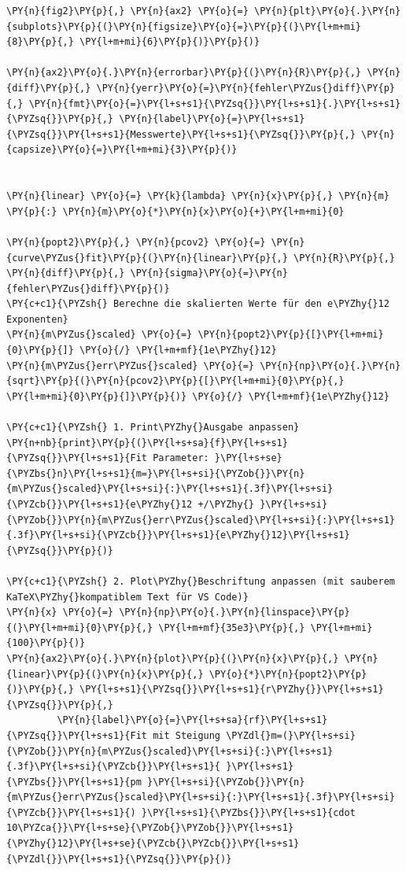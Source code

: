\begin{tcolorbox}[breakable, size=fbox, boxrule=1pt, pad at break*=1mm,colback=cellbackground, colframe=cellborder]
\begin{Verbatim}[commandchars=\\\{\}]
\PY{n}{fig2}\PY{p}{,} \PY{n}{ax2} \PY{o}{=} \PY{n}{plt}\PY{o}{.}\PY{n}{subplots}\PY{p}{(}\PY{n}{figsize}\PY{o}{=}\PY{p}{(}\PY{l+m+mi}{8}\PY{p}{,} \PY{l+m+mi}{6}\PY{p}{)}\PY{p}{)}

\PY{n}{ax2}\PY{o}{.}\PY{n}{errorbar}\PY{p}{(}\PY{n}{R}\PY{p}{,} \PY{n}{diff}\PY{p}{,} \PY{n}{yerr}\PY{o}{=}\PY{n}{fehler\PYZus{}diff}\PY{p}{,} \PY{n}{fmt}\PY{o}{=}\PY{l+s+s1}{\PYZsq{}}\PY{l+s+s1}{.}\PY{l+s+s1}{\PYZsq{}}\PY{p}{,} \PY{n}{label}\PY{o}{=}\PY{l+s+s1}{\PYZsq{}}\PY{l+s+s1}{Messwerte}\PY{l+s+s1}{\PYZsq{}}\PY{p}{,} \PY{n}{capsize}\PY{o}{=}\PY{l+m+mi}{3}\PY{p}{)}


\PY{n}{linear} \PY{o}{=} \PY{k}{lambda} \PY{n}{x}\PY{p}{,} \PY{n}{m} \PY{p}{:} \PY{n}{m}\PY{o}{*}\PY{n}{x}\PY{o}{+}\PY{l+m+mi}{0}

\PY{n}{popt2}\PY{p}{,} \PY{n}{pcov2} \PY{o}{=} \PY{n}{curve\PYZus{}fit}\PY{p}{(}\PY{n}{linear}\PY{p}{,} \PY{n}{R}\PY{p}{,} \PY{n}{diff}\PY{p}{,} \PY{n}{sigma}\PY{o}{=}\PY{n}{fehler\PYZus{}diff}\PY{p}{)}
\PY{c+c1}{\PYZsh{} Berechne die skalierten Werte für den e\PYZhy{}12 Exponenten}
\PY{n}{m\PYZus{}scaled} \PY{o}{=} \PY{n}{popt2}\PY{p}{[}\PY{l+m+mi}{0}\PY{p}{]} \PY{o}{/} \PY{l+m+mf}{1e\PYZhy{}12}
\PY{n}{m\PYZus{}err\PYZus{}scaled} \PY{o}{=} \PY{n}{np}\PY{o}{.}\PY{n}{sqrt}\PY{p}{(}\PY{n}{pcov2}\PY{p}{[}\PY{l+m+mi}{0}\PY{p}{,} \PY{l+m+mi}{0}\PY{p}{]}\PY{p}{)} \PY{o}{/} \PY{l+m+mf}{1e\PYZhy{}12}

\PY{c+c1}{\PYZsh{} 1. Print\PYZhy{}Ausgabe anpassen}
\PY{n+nb}{print}\PY{p}{(}\PY{l+s+sa}{f}\PY{l+s+s1}{\PYZsq{}}\PY{l+s+s1}{Fit Parameter: }\PY{l+s+se}{\PYZbs{}n}\PY{l+s+s1}{m=}\PY{l+s+si}{\PYZob{}}\PY{n}{m\PYZus{}scaled}\PY{l+s+si}{:}\PY{l+s+s1}{.3f}\PY{l+s+si}{\PYZcb{}}\PY{l+s+s1}{e\PYZhy{}12 +/\PYZhy{} }\PY{l+s+si}{\PYZob{}}\PY{n}{m\PYZus{}err\PYZus{}scaled}\PY{l+s+si}{:}\PY{l+s+s1}{.3f}\PY{l+s+si}{\PYZcb{}}\PY{l+s+s1}{e\PYZhy{}12}\PY{l+s+s1}{\PYZsq{}}\PY{p}{)}

\PY{c+c1}{\PYZsh{} 2. Plot\PYZhy{}Beschriftung anpassen (mit sauberem KaTeX\PYZhy{}kompatiblem Text für VS Code)}
\PY{n}{x} \PY{o}{=} \PY{n}{np}\PY{o}{.}\PY{n}{linspace}\PY{p}{(}\PY{l+m+mi}{0}\PY{p}{,} \PY{l+m+mf}{35e3}\PY{p}{,} \PY{l+m+mi}{100}\PY{p}{)}
\PY{n}{ax2}\PY{o}{.}\PY{n}{plot}\PY{p}{(}\PY{n}{x}\PY{p}{,} \PY{n}{linear}\PY{p}{(}\PY{n}{x}\PY{p}{,} \PY{o}{*}\PY{n}{popt2}\PY{p}{)}\PY{p}{,} \PY{l+s+s1}{\PYZsq{}}\PY{l+s+s1}{r\PYZhy{}}\PY{l+s+s1}{\PYZsq{}}\PY{p}{,} 
         \PY{n}{label}\PY{o}{=}\PY{l+s+sa}{rf}\PY{l+s+s1}{\PYZsq{}}\PY{l+s+s1}{Fit mit Steigung \PYZdl{}m=(}\PY{l+s+si}{\PYZob{}}\PY{n}{m\PYZus{}scaled}\PY{l+s+si}{:}\PY{l+s+s1}{.3f}\PY{l+s+si}{\PYZcb{}}\PY{l+s+s1}{ }\PY{l+s+s1}{\PYZbs{}}\PY{l+s+s1}{pm }\PY{l+s+si}{\PYZob{}}\PY{n}{m\PYZus{}err\PYZus{}scaled}\PY{l+s+si}{:}\PY{l+s+s1}{.3f}\PY{l+s+si}{\PYZcb{}}\PY{l+s+s1}{) }\PY{l+s+s1}{\PYZbs{}}\PY{l+s+s1}{cdot 10\PYZca{}}\PY{l+s+se}{\PYZob{}\PYZob{}}\PY{l+s+s1}{\PYZhy{}12}\PY{l+s+se}{\PYZcb{}\PYZcb{}}\PY{l+s+s1}{\PYZdl{}}\PY{l+s+s1}{\PYZsq{}}\PY{p}{)}


\end{Verbatim}
\end{tcolorbox}
